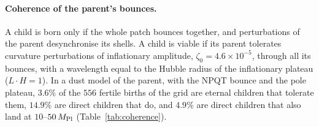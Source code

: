 \documentclass[11pt,a4paper]{article}
\newcommand{\Mpl}{M_{\rm Pl}}
\begin{document}
\paragraph{Coherence of the parent's bounces.}
A child is born only if the whole patch bounces together, and perturbations of the parent desynchronise its shells.
A child is viable if its parent tolerates curvature perturbations of inflationary amplitude, $\zeta_0=4.6\times10^{-5}$, through all its bounces, with a wavelength equal to the Hubble radius of the inflationary plateau ($L\cdot H=1$).
In a dust model of the parent, with the NPQT bounce and the pole plateau, $3.6\%$ of the $556$ fertile births of the grid are eternal children that tolerate them, $14.9\%$ are direct children that do, and $4.9\%$ are direct children that also land at $10$--$50\,\Mpl$ (Table~\ref{tab:coherence}).
\end{document}
